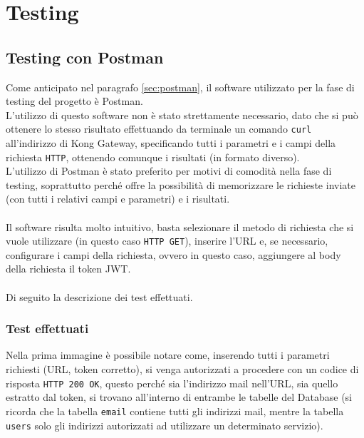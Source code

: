 \chapter{Testing}\label{chapter:testing}
\section{Testing con Postman}\label{sec:test1}
Come anticipato nel paragrafo \ref{sec:postman}, il software utilizzato per la fase di testing del progetto è Postman.\\
L'utilizzo di questo software non è stato strettamente necessario, dato che si può ottenere lo stesso risultato effettuando da terminale un comando \texttt{curl}
all'indirizzo di Kong Gateway, specificando tutti i parametri e i campi della richiesta \texttt{HTTP}, ottenendo comunque i risultati (in formato diverso).\\
L'utilizzo di Postman è stato preferito per motivi di comodità nella fase di testing, soprattutto perché offre la possibilità di memorizzare le richieste inviate 
(con tutti i relativi campi e parametri) e i risultati.\\ \\
Il software risulta molto intuitivo, basta selezionare il metodo di richiesta che si vuole utilizzare (in questo caso \texttt{HTTP GET}), 
inserire l'URL e, se necessario, configurare i campi della richiesta, ovvero in questo caso, aggiungere al body della richiesta il token JWT.\\ \\

Di seguito la descrizione dei test effettuati.\\

\subsection{Test effettuati}\label{subsec:testeffettuati}

Nella prima immagine è possibile notare come, inserendo tutti i parametri richiesti (URL, token corretto), si venga autorizzati a procedere con un codice di risposta
\texttt{HTTP 200 OK}, questo perché sia l'indirizzo mail nell'URL, sia quello estratto dal token, si trovano all'interno di entrambe le tabelle del Database 
(si ricorda che la tabella \texttt{email} contiene tutti gli indirizzi mail, mentre la tabella \texttt{users} solo gli indirizzi autorizzati ad utilizzare un determinato servizio).


